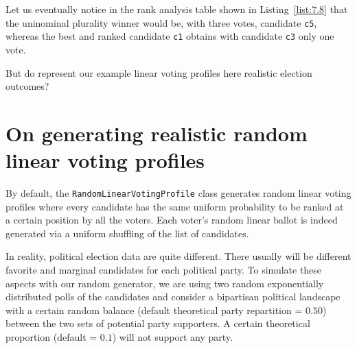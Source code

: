 Let us eventually notice in the rank analysis table shown in Listing~\vref{list:7.8} that the uninominal plurality winner would be, with three votes, candidate \texttt{c5}, whereas the best \NetFlows and \Borda ranked candidate \texttt{c1} obtains with candidate \texttt{c3} only one vote.

But do represent our example linear voting profiles here realistic election outcomes?

\section{On generating realistic random linear voting profiles}
\label{sec:7.5}

By default, the \texttt{RandomLinearVotingProfile} class generates random linear voting profiles where every candidate has the same uniform probability to be ranked at a certain position by all the voters. Each voter's random linear ballot is indeed generated  via a uniform shuffling of the list of candidates.

In reality, political election data are quite different. There usually will be different favorite and marginal candidates for each political party. To simulate these aspects with our random generator, we are using two random exponentially distributed polls of the candidates and consider a bipartisan political landscape with a certain random balance (default theoretical party repartition = $0.50$) between the two sets of potential party supporters. A certain theoretical proportion (default = $0.1$) will not support any party.

